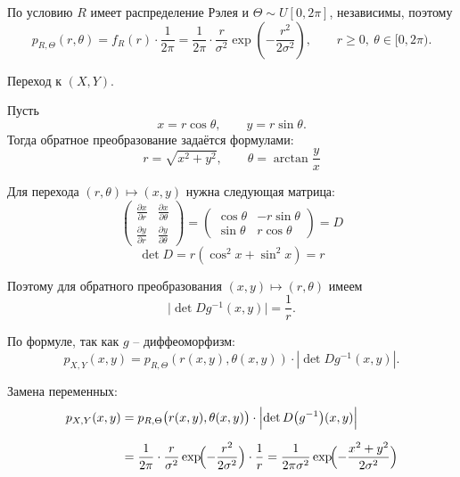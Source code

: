 \documentclass[a4paper,14pt]{extarticle}
\begin{document}
            По условию \(R\) имеет распределение Рэлея и \(\Theta\sim U[0,2\pi]\), независимы, поэтому
            \[
                p_{R,\Theta}(r,\theta) = f_R(r) \cdot \frac{1}{2\pi}
                = \frac{1}{2\pi} \cdot \frac{r}{\sigma^2} \exp\left(-\frac{r^2}{2\sigma^2}\right),
                \qquad r \ge 0, \ \theta \in [0, 2\pi).
            \]
            
            
            Переход к $(X,Y)$.
            
            Пусть
            \[
                x = r\cos\theta, \qquad y = r\sin\theta.
            \]
            Тогда обратное преобразование задаётся формулами:
            \[
                r = \sqrt{x^2 + y^2},
                \qquad
                \theta = \arctan\!\dfrac{y}{x}
            \]

            Для перехода $(r,\theta) \mapsto (x,y)$ нужна следующая матрица:
            \[
            \begin{pmatrix}
                \frac{\partial x}{\partial r} & \frac{\partial x}{\partial \theta} \\
                \frac{\partial y}{\partial r} & \frac{\partial y}{\partial \theta}
            \end{pmatrix} =
            \begin{pmatrix}
                \cos \theta & -r \sin \theta \\
                \sin \theta & r \cos \theta
            \end{pmatrix} = D
            \]
            \[
            \det D = r(\cos^2 x + \sin^2 x) = r\]

            Поэтому для обратного преобразования $(x,y) \mapsto (r,\theta)$ имеем
            \[
                \big|\det Dg^{-1}(x,y)\big| = \frac{1}{r}.
            \]

            По формуле, так как $g$ -- диффеоморфизм:
            \[
                p_{X,Y}(x,y) = p_{R,\Theta}(r(x,y), \theta(x,y)) \cdot \left|\det Dg^{-1}(x,y)\right|.
            \]
            
            Замена переменных:
            \[
            \begin{aligned}
            p_{X,Y}(x,y)
            &= p_{R,\Theta}\bigl(r(x,y),\theta(x,y)\bigr)\cdot\Bigl|\det D\bigl(g^{-1}\bigr)(x,y)\Bigr|\\[6pt]
            &= \frac{1}{2\pi}\cdot\frac{r}{\sigma^2}\exp\!\Bigl(-\frac{r^2}{2\sigma^2}\Bigr)\cdot\frac{1}{r}
            = \frac{1}{2\pi\sigma^2}\exp\!\Bigl(-\frac{x^2+y^2}{2\sigma^2}\Bigr)
            \end{aligned}
            \]
\end{document}
